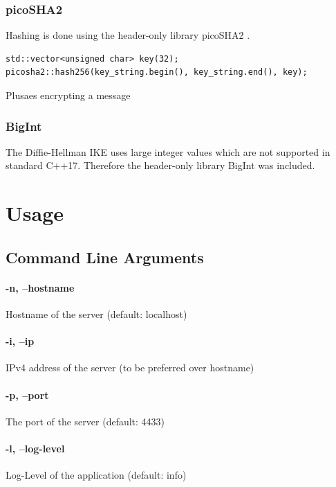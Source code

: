 \documentclass[12pt, letterpaper]{article}
\newenvironment{code}{\captionsetup{type=listing}}{}
\begin{document}
\subsubsection{picoSHA2}
Hashing is done using the header-only library picoSHA2 \cite{picosha}.

\begin{code}
	\begin{verbatim}
std::vector<unsigned char> key(32);
picosha2::hash256(key_string.begin(), key_string.end(), key);
	\end{verbatim}
	\caption{Plusaes encrypting a message}
	\label{picosha2}
\end{code}

\subsubsection{BigInt}
The Diffie-Hellman IKE uses large integer values which are not supported in standard C++17. Therefore the header-only library BigInt \cite{bigint} was included.


\section{Usage}
\label{usage}

\subsection{Command Line Arguments}

\paragraph{-n, --hostname}
Hostname of the server (default: localhost)

\paragraph{-i, --ip}
IPv4 address of the server (to be preferred over hostname)

\paragraph{-p, --port}
The port of the server (default: 4433)

\paragraph{-l, --log-level}
Log-Level of the application (default: info)
\end{document}
